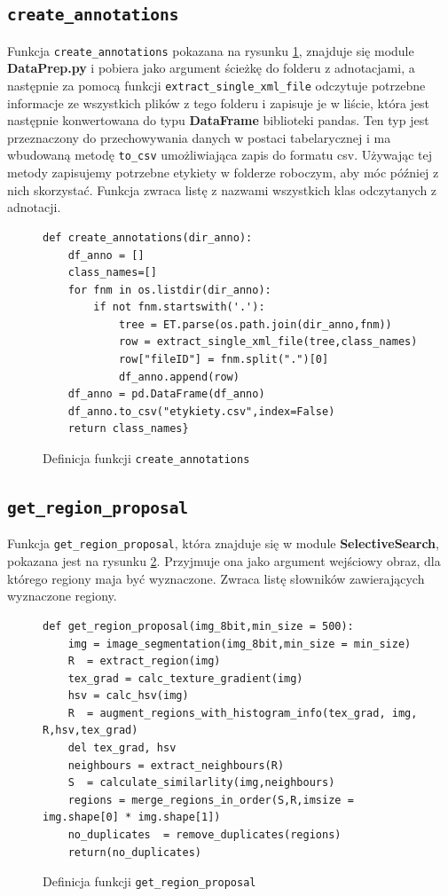 \documentclass[a4paper,twoside,12pt]{book}
\begin{document}
{\subsection{ \lstinline|create_annotations|}
{ Funkcja \lstinline|create_annotations| pokazana na rysunku \ref{dataprep}, znajduje się module \textbf{DataPrep.py} i pobiera jako argument ścieżkę do folderu z adnotacjami, a następnie za pomocą funkcji \lstinline|extract_single_xml_file| odczytuje potrzebne informacje ze wszystkich plików z tego folderu  i zapisuje je w liście, która jest następnie konwertowana do typu \textbf{DataFrame} biblioteki pandas. Ten typ jest przeznaczony do przechowywania danych w postaci tabelarycznej i ma wbudowaną metodę \lstinline|to_csv| umożliwiająca zapis do formatu csv. Używając tej metody zapisujemy potrzebne etykiety w folderze roboczym, aby móc później z nich skorzystać. Funkcja zwraca listę z nazwami wszystkich klas odczytanych z adnotacji.}
\begin{figure}[h!]
\centering
\begin{lstlisting}
def create_annotations(dir_anno):
    df_anno = []
    class_names=[]
    for fnm in os.listdir(dir_anno):  
        if not fnm.startswith('.'):
            tree = ET.parse(os.path.join(dir_anno,fnm))
            row = extract_single_xml_file(tree,class_names)
            row["fileID"] = fnm.split(".")[0]
            df_anno.append(row)
    df_anno = pd.DataFrame(df_anno)
    df_anno.to_csv("etykiety.csv",index=False)
    return class_names}

\end{lstlisting}
\caption{Definicja funkcji \lstinline|create_annotations|}
\label{dataprep}
\end{figure}
\subsection{\lstinline|get_region_proposal|}
 Funkcja \lstinline|get_region_proposal|, która znajduje się w module \textbf{SelectiveSearch}, pokazana jest na rysunku \ref{search}. Przyjmuje ona jako argument wejściowy obraz, dla którego regiony maja być wyznaczone. Zwraca listę słowników zawierających wyznaczone regiony.}
\begin{figure}[h!]
\centering
\begin{lstlisting}
def get_region_proposal(img_8bit,min_size = 500):
    img = image_segmentation(img_8bit,min_size = min_size)
    R  = extract_region(img)    
    tex_grad = calc_texture_gradient(img)
    hsv = calc_hsv(img)
    R  = augment_regions_with_histogram_info(tex_grad, img, R,hsv,tex_grad)
    del tex_grad, hsv
    neighbours = extract_neighbours(R)
    S  = calculate_similarlity(img,neighbours)
    regions = merge_regions_in_order(S,R,imsize = img.shape[0] * img.shape[1])
    no_duplicates  = remove_duplicates(regions)
    return(no_duplicates)
\end{lstlisting}
\caption{Definicja funkcji  \lstinline|get_region_proposal|}
\label{search}
\end{figure}
\end{document}
